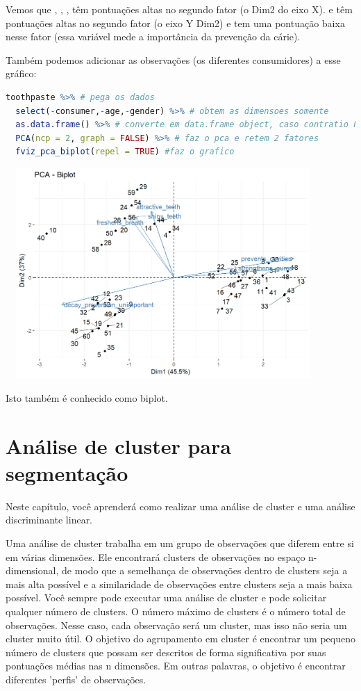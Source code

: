 \documentclass{article}
\begin{document}
Vemos que , , , têm pontuações altas no segundo fator (o Dim2 do eixo X).  e  têm pontuações altas no segundo fator (o eixo Y Dim2) e  tem uma pontuação baixa nesse fator (essa variável mede a importância da prevenção da cárie).

\newpage

Também podemos adicionar as observações (os diferentes consumidores) a esse gráfico:

\begin{lstlisting}[language=R]
toothpaste %>% # pega os dados
  select(-consumer,-age,-gender) %>% # obtem as dimensoes somente
  as.data.frame() %>% # converte em data.frame object, caso contratio PCA nao aceita
  PCA(ncp = 2, graph = FALSE) %>% # faz o pca e retem 2 fatores
  fviz_pca_biplot(repel = TRUE) #faz o grafico
\end{lstlisting}


\begin{center}
\includegraphics[width=12cm,height=8cm]{perceptual_tp_biplot-1.png}
\end{center}

Isto também é conhecido como biplot.

\newpage
\section{Análise de cluster para segmentação}

Neste capítulo, você aprenderá como realizar uma análise de cluster e uma análise discriminante linear.

Uma análise de cluster trabalha em um grupo de observações que diferem entre si em várias dimensões. Ele encontrará clusters de observações no espaço n-dimensional, de modo que a semelhança de observações dentro de clusters seja a mais alta possível e a similaridade de observações entre clusters seja a mais baixa possível. Você sempre pode executar uma análise de cluster e pode solicitar qualquer número de clusters. O número máximo de clusters é o número total de observações. Nesse caso, cada observação será um cluster, mas isso não seria um cluster muito útil. O objetivo do agrupamento em cluster é encontrar um pequeno número de clusters que possam ser descritos de forma significativa por suas pontuações médias nas n dimensões. Em outras palavras, o objetivo é encontrar diferentes 'perfis' de observações.
\end{document}
